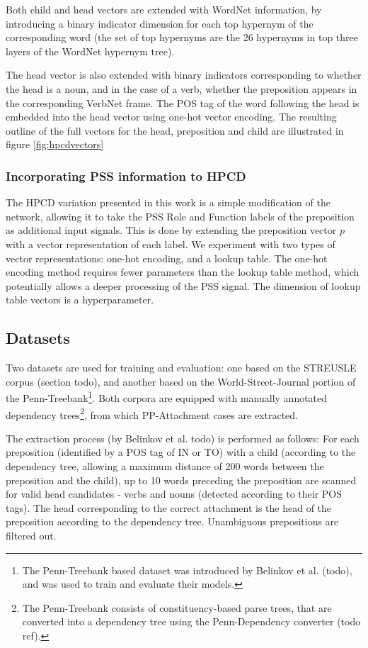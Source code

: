 Both child and head vectors are extended with WordNet information, by introducing a binary indicator dimension for each top hypernym of the corresponding word (the set of top hypernyms are the 26 hypernyms in top three layers of the WordNet hypernym tree). 

The head vector is also extended with binary indicators corresponding to whether the head is a noun, and in the case of a verb, whether the preposition appears in the corresponding VerbNet frame. The POS tag of the word following the head is embedded into the head vector using one-hot vector encoding. The resulting outline of the full vectors for the head, preposition and child are illustrated in figure \ref{fig:hpcdvectors}

\subsubsection{Incorporating PSS information to HPCD}

The HPCD variation presented in this work is a simple modification of the network, allowing it to take the PSS Role and Function labels of the preposition as additional input signals. This is done by extending the preposition vector $p$ with a vector representation of each label. We experiment with two types of vector representations: one-hot encoding, and a lookup table. The one-hot encoding method requires fewer parameters than the lookup table method, which potentially allows a deeper processing of the PSS signal. The dimension of lookup table vectors is a hyperparameter.

\subsection{Datasets}

Two datasets are used for training and evaluation: one based on the STREUSLE corpus (section todo), and another based on the World-Street-Journal portion of the Penn-Treebank\footnote{The Penn-Treebank based dataset was introduced by Belinkov et al. (todo), and was used to train and evaluate their models.}. Both corpora are equipped with manually annotated dependency trees\footnote{The Penn-Treebank consists of constituency-based parse trees, that are converted into a dependency tree using the Penn-Dependency converter (todo ref).}, from which PP-Attachment cases are extracted. 

The extraction process (by Belinkov et al. todo) is performed as follows: For each preposition (identified by a POS tag of IN or TO) with a child (according to the dependency tree, allowing a maximum distance of 200 words between the preposition and the child), up to 10 words preceding the preposition are scanned for valid head candidates - verbs and nouns (detected according to their POS tags). The head corresponding to the correct attachment is the head of the preposition according to the dependency tree. Unambiguous prepositions are filtered out.

